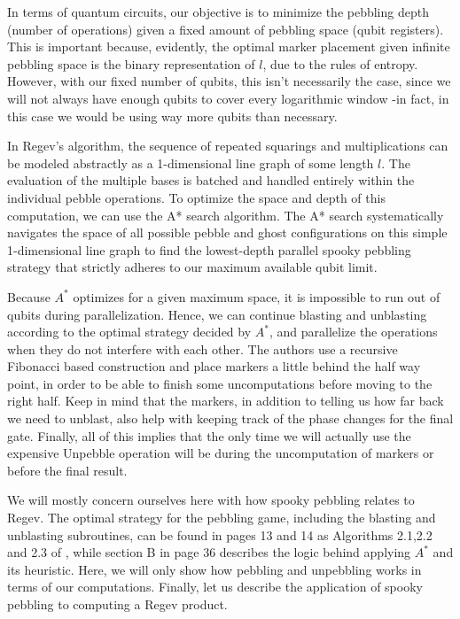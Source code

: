 In terms of quantum circuits, our objective is to minimize the pebbling depth (number of operations) given a fixed amount of pebbling space (qubit registers). This is important because, evidently, the optimal marker placement given infinite pebbling space is the binary representation of $l$, due to the rules of entropy. However, with our fixed number of qubits, this isn't necessarily the case, since we will not always have enough qubits to cover every logarithmic window -in fact, in this case we would be using way more qubits than necessary.

In Regev's algorithm, the sequence of repeated squarings and multiplications can be modeled abstractly as a 1-dimensional line graph of some length $l$. The evaluation of the multiple bases is batched and handled entirely within the individual pebble operations. To optimize the space and depth of this computation, we can use the A* search algorithm. The A* search systematically navigates the space of all possible pebble and ghost configurations on this simple 1-dimensional line graph to find the lowest-depth parallel spooky pebbling strategy that strictly adheres to our maximum available qubit limit. 

Because $A^*$ optimizes for a given maximum space, it is impossible to run out of qubits during parallelization. Hence, we can continue blasting and unblasting according to the optimal strategy decided by $A^*$, and parallelize the operations when they do not interfere with each other.  The authors use a recursive Fibonacci based construction and place markers a little behind the half way point, in order to be able to finish some uncomputations before moving to the right half. Keep in mind that the markers, in addition to telling us how far back we need to unblast, also help with keeping track of the phase changes for the final gate. Finally, all of this implies that the only time we will actually use the expensive Unpebble operation will be during the uncomputation of markers or before the final result.

We will mostly concern ourselves here with how spooky pebbling relates to Regev. The optimal strategy for the pebbling game, including the blasting and unblasting subroutines, can be found in pages 13 and 14 as Algorithms 2.1,2.2 and 2.3 of \cite{KahanamokuMeyerRagavanVanKirk2024}, while section B in page 36 describes the logic behind applying $A^*$ and its heuristic. Here, we will only show how pebbling and unpebbling works in terms of our computations. Finally, let us describe the application of spooky pebbling to computing a Regev product.\\

